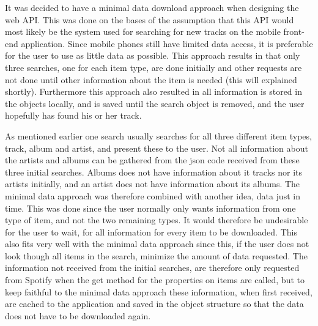It was decided to have a minimal data download approach when designing the web API. This was done on the bases of the assumption that this API would most likely be the system used for searching for new tracks on the mobile front-end application. Since mobile phones still have limited data access, it is preferable for the user to use as little data as possible. This approach results in that only three searches, one for each item type, are done initially and other requests are not done until other information about the item is needed (this will explained shortly). Furthermore this approach also resulted in all information is stored in the objects locally, and is saved until the search object is removed, and the user hopefully has found his or her track.


As mentioned earlier one search usually searches for all three different item types, track, album and artist, and present these to the user. Not all information about the artists and albums can be gathered from the json code received from these three initial searches. Albums does not have information about it tracks nor its artists initially, and an artist does not have information about its albums. The minimal data approach was therefore combined with another idea, data just in time. This was done since the user normally only wants information from one type of item, and not the two remaining types. It would therefore be undesirable for the user to wait, for all information for every item to be downloaded. This also fits very well with the minimal data approach since this, if the user does not look though all items in the search, minimize the amount of data requested. The information not received from the initial searches, are therefore only requested from Spotify when the get method for the properties on items are called, but to keep faithful to the minimal data approach these information, when first received, are cached to the application and saved in the object structure so that the data does not have to be downloaded again.